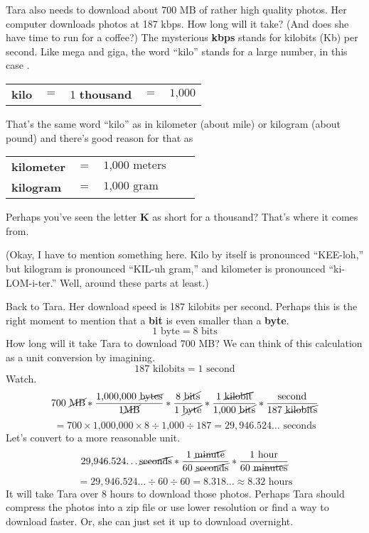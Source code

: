 Tara also needs to download about 700 MB of rather high quality photos.  Her computer downloads photos at 187 kbps.  How long will it take?  (And does she have time to run for a coffee?)  The mysterious \textbf{kbps} stands for kilobits (Kb) per second.  Like mega and giga, the word ``kilo'' stands for a large number, in this case .  
\begin{center}
\begin{tabular} {lclcr} 
\textbf{kilo} &$=$&1 \textbf{ thousand} &$=$&$ \text{1,000}$\\
\end{tabular}
\end{center}
That's the same word ``kilo'' as in kilometer (about  mile) or kilogram (about  pound) and there's good reason for that as  
\begin{center}
\begin{tabular} {lclcr} 
\textbf{kilometer} &$=$&$ \text{1,000 meters}$\\
\textbf{kilogram} &$=$&$ \text{1,000 gram}$\\
\end{tabular}
\end{center}
Perhaps you've seen the letter \textbf{K} as short for a thousand?  That's where it comes from. 

(Okay, I have to mention something here.  Kilo by itself is pronounced ``KEE-loh,'' but kilogram is pronounced ``KIL-uh gram,'' and kilometer is pronounced ``ki-LOM-i-ter.''   Well, around these parts at least.)

Back to Tara.  Her download speed is 187 kilobits per second. Perhaps this is the right moment to mention that a \textbf{bit} is even smaller than a \textbf{byte}.
$$1 \text{ byte} = 8 \text{ bits}$$
How long will it take Tara to download 700 MB?  We can think of this calculation as a unit conversion by imagining.
$$187 \text{ kilobits} = 1 \text{ second}$$  Watch.
$$ 700 \text{ \cancel{MB}} 
\ast \frac{\text{1,000,000 \cancel{bytes}}}{1 \text{\cancel{MB}}}
\ast \frac{8 \text{ \cancel{bits}}}{1 \text{ \cancel{byte}}} 
\ast \frac{ 1 \text{ \cancel{kilobit}}}{\text{1,000 \cancel{bits}}}
\ast \frac{\text{second}} {187 \text{ \cancel{kilobits}}}
$$
$$= 700 \times \text{1,000,000} \times 8 \div \text{1,000} \div 187
= 29,946.524\ldots\text{ seconds} $$
Let's convert to a more reasonable unit.  
$$\text{29,946.524\ldots \cancel{seconds}} 
\ast \frac{1 \text{ \cancel{minute}}}{60 \text{ \cancel{seconds}}} 
\ast \frac{1 \text{ hour}}{60 \text{ \cancel{minutes}}} $$
$$ = 29,946.524\ldots \div 60 \div 60 = 8.318\ldots \approx 8.32 \text{ hours}$$
It will take Tara over 8 hours to download those photos.  
Perhaps Tara should compress the photos into a zip file or use lower resolution or find a way to download faster.  Or, she can just set it up to download overnight.  

